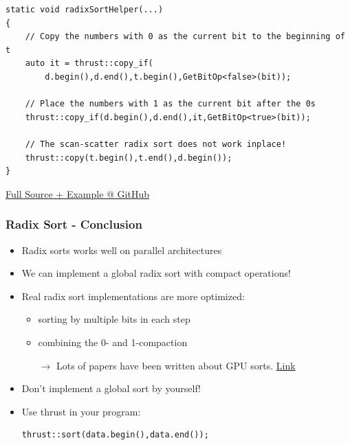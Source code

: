 \documentclass[aspectratio=169,handout]{beamer}
\begin{document}
\begin{frame}[fragile]

\begin{lstlisting}
static void radixSortHelper(...)
{
	// Copy the numbers with 0 as the current bit to the beginning of t
	auto it = thrust::copy_if(
		d.begin(),d.end(),t.begin(),GetBitOp<false>(bit));
	
	// Place the numbers with 1 as the current bit after the 0s
	thrust::copy_if(d.begin(),d.end(),it,GetBitOp<true>(bit));
	
	// The scan-scatter radix sort does not work inplace!
	thrust::copy(t.begin(),t.end(),d.begin());
}
\end{lstlisting}

\href{https://github.com/darglein/saiga/blob/master/samples/cuda/radixSort/main.cu}{Full Source + Example @ GitHub}
\end{frame}




\begin{frame}[fragile]
	\frametitle{Radix Sort - Conclusion}
	\begin{itemize}
		\item Radix sorts works well on parallel architectures
		\item<2-> We can implement a global radix sort with compact operations!
		\item<3-> Real radix sort implementations are more optimized:
		\begin{itemize}
			\item sorting by multiple bits in each step
			\item combining the 0- and 1-compaction
			\item[$\rightarrow$] Lots of papers have been written about GPU sorts. 
			\href{https://ieeexplore.ieee.org/abstract/document/5161005}{Link}
		\end{itemize}
	\item<4-> Don't implement a global sort by yourself!
	\item<5->[$\rightarrow$] Use thrust in your program:
\begin{lstlisting}
thrust::sort(data.begin(),data.end());
\end{lstlisting}
	\end{itemize}
\end{frame}
\end{document}
